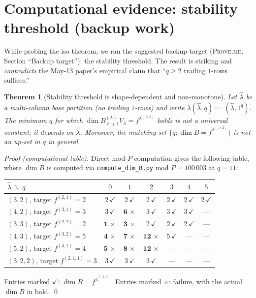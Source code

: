 \documentclass[11pt]{article}
\newtheorem{theorem}{Theorem}
\theoremstyle{definition}
\begin{document}
\section{Computational evidence: stability threshold (backup work)}\label{sec:stability}

While probing the iso theorem, we ran the suggested backup target
(\textsc{Prove.md}, Section ``Backup target''): the stability threshold.
The result is striking and \emph{contradicts} the May-13 paper's
empirical claim that ``$q \ge 2$ trailing $1$-rows suffices.''

\begin{theorem}[Stability threshold is shape-dependent and non-monotone]\label{thm:stab-shape-dep}
Let $\widehat\lambda$ be a multi-column base partition (no trailing
$1$-rows) and write $\lambda(\widehat\lambda, q) := (\widehat\lambda, 1^q)$.
The minimum $q$ for which $\dim B_{\ell+1}^{(\lambda)} V_\lambda = f^{\lambda^{(\ge 2)}}$
holds is \emph{not} a universal constant; it depends on $\widehat\lambda$.
Moreover, the matching set $\{q : \dim B = f^{\lambda^{(\ge 2)}}\}$ is
\emph{not} an up-set in $q$ in general.
\end{theorem}

\begin{proof}[Proof (computational table)]
Direct mod-$P$ computation gives the following table, where $\dim B$
is computed via \texttt{compute\_dim\_B.py} mod $P = 100\,003$ at
$q = 11$:

\begin{center}
\renewcommand{\arraystretch}{1.15}
\begin{tabular}{l|cccccc}
\toprule
$\widehat\lambda \;\backslash\; q$ & $0$ & $1$ & $2$ & $3$ & $4$ & $5$ \\
\midrule
$(3, 2)$, target $f^{(2,1)} = 2$
   & $2\,\checkmark$ & $2\,\checkmark$ & $2\,\checkmark$ & $2\,\checkmark$ & $2\,\checkmark$ & $2\,\checkmark$ \\
$(4, 2)$, target $f^{(3,1)} = 3$
   & $3\,\checkmark$ & $\mathbf{6}\,\times$ & $3\,\checkmark$ & $3\,\checkmark$ & $3\,\checkmark$ & --- \\
$(3, 3)$, target $f^{(2,2)} = 2$
   & $\mathbf{1}\,\times$ & $\mathbf{3}\,\times$ & $2\,\checkmark$ & $2\,\checkmark$ & $2\,\checkmark$ & --- \\
$(4, 3)$, target $f^{(3,2)} = 5$
   & $\mathbf{4}\,\times$ & $\mathbf{7}\,\times$ & $\mathbf{12}\,\times$ & $5\,\checkmark$ & --- & --- \\
$(5, 2)$, target $f^{(4,1)} = 4$
   & $\mathbf{5}\,\times$ & $\mathbf{8}\,\times$ & $\mathbf{12}\,\times$ & --- & --- & --- \\
$(3, 2, 2)$, target $f^{(2,1,1)} = 3$
   & $3\,\checkmark$ & $3\,\checkmark$ & $3\,\checkmark$ & --- & --- & --- \\
\bottomrule
\end{tabular}
\end{center}

\noindent
Entries marked $\checkmark$: $\dim B = f^{\widehat\lambda^{(\ge 2)}}$.
Entries marked $\times$: failure, with the actual $\dim B$ in bold.
\qed
\end{proof}
\end{document}
